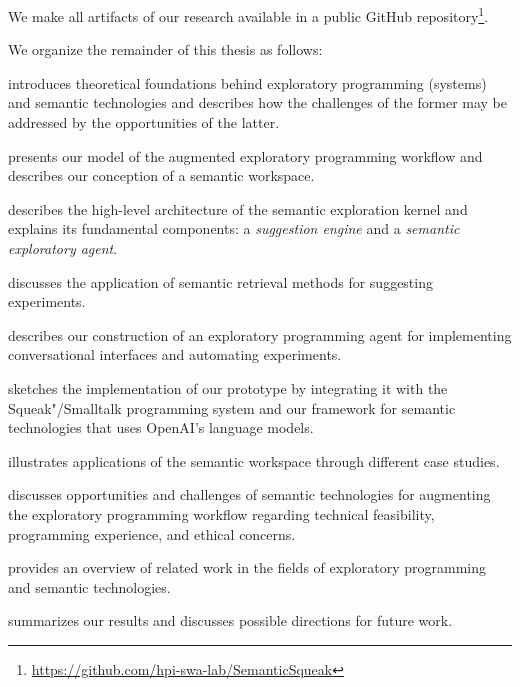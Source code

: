 We make all artifacts of our research available in a public GitHub repository\footnote{\url{https://github.com/hpi-swa-lab/SemanticSqueak}}. %

We organize the remainder of this thesis as follows:
%
\begin{description}[noextralabelsep]
	\item[\Cref{cha:background}] introduces theoretical foundations behind exploratory programming (systems) and semantic technologies and describes how the challenges of the former may be addressed by the opportunities of the latter.
	\item[\Cref{cha:approach}] presents our model of the augmented exploratory programming workflow and describes our conception of a semantic workspace.
	\item[\Cref{cha:design}] describes the high-level architecture of the semantic exploration kernel and explains its fundamental components: a \emph{suggestion engine} and a \emph{semantic exploratory agent}.
	\item[\Cref{cha:suggestions}] discusses the application of semantic retrieval methods for suggesting experiments.
	\item[\Cref{cha:agent}] describes our construction of an exploratory programming agent for implementing conversational interfaces and automating experiments. %
	\item[\Cref{cha:implementation}] sketches the implementation of our prototype by integrating it with the Squeak"/Smalltalk programming system and our \semtex framework for semantic technologies that uses OpenAI's language models.
	\item[\Cref{cha:application}] illustrates applications of the semantic workspace through dif\-fer\-ent case studies.
	\item[\Cref{cha:discussion}] discusses opportunities and challenges of semantic technologies for augmenting the exploratory programming workflow regarding technical feasibility, programming experience, and ethical concerns.
	\item[\Cref{cha:related_work}] provides an overview of related work in the fields of exploratory programming and semantic technologies.
	\item[\Cref{cha:conclusion}] summarizes our results and discusses possible directions for future work.
\end{description}
